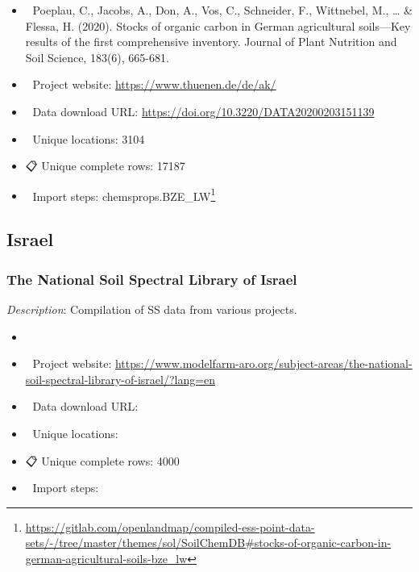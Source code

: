 \documentclass[
  graybox,natbib,nospthms]{svmono}
\providecommand{\tightlist}{%
  \setlength{\itemsep}{0pt}\setlength{\parskip}{0pt}}
\providecommand{\tightlist}{\setlength{\itemsep}{0pt}\setlength{\parskip}{0pt}}
\renewcommand{\href}[2]{#2 (\url{#1})}
\renewcommand{\href}[2]{#2\footnote{\url{#1}}}
\begin{document}
\begin{itemize}
\tightlist
\item
  📕 Poeplau, C., Jacobs, A., Don, A., Vos, C., Schneider, F., Wittnebel, M., \ldots{} \& Flessa, H. (2020). Stocks of organic carbon in German agricultural soils---Key results of the first comprehensive inventory. Journal of Plant Nutrition and Soil Science, 183(6), 665-681.\\
\item
  🔗 Project website: \url{https://www.thuenen.de/de/ak/}\\
\item
  📂 Data download URL: \url{https://doi.org/10.3220/DATA20200203151139}\\
\item
  📍 Unique locations: 3104\\
\item
  📋 Unique complete rows: 17187\\
\item
  📝 Import steps: \href{https://gitlab.com/openlandmap/compiled-ess-point-data-sets/-/tree/master/themes/sol/SoilChemDB\#stocks-of-organic-carbon-in-german-agricultural-soils-bze_lw}{chemsprops.BZE\_LW}
\end{itemize}

\hypertarget{israel}{%
\subsection{Israel}\label{israel}}

\hypertarget{the-national-soil-spectral-library-of-israel}{%
\subsubsection{The National Soil Spectral Library of Israel}\label{the-national-soil-spectral-library-of-israel}}

\emph{Description}: Compilation of SS data from various projects.

\begin{itemize}
\tightlist
\item
  📕\\
\item
  🔗 Project website: \url{https://www.modelfarm-aro.org/subject-areas/the-national-soil-spectral-library-of-israel/?lang=en}\\
\item
  📂 Data download URL:\\
\item
  📍 Unique locations:\\
\item
  📋 Unique complete rows: 4000\\
\item
  📝 Import steps:
\end{itemize}
\end{document}

